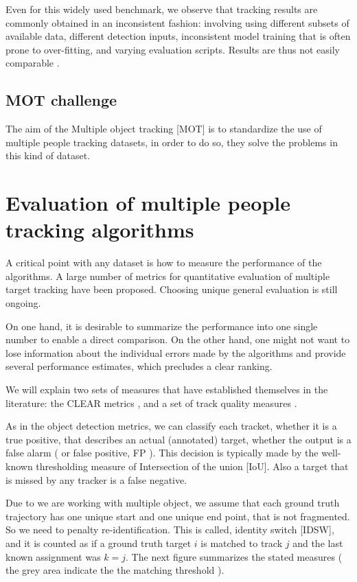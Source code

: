 Even for this widely used benchmark, we observe that tracking results are commonly obtained in an inconsistent fashion: involving using different subsets of available data, different detection inputs, inconsistent model training that is often prone to over-fitting, and varying evaluation scripts. Results are thus not easily comparable \cite{mot}.


\subsection{MOT challenge}

The aim of the Multiple object tracking [MOT] is to standardize the use of multiple people tracking datasets, in order to do so, they solve the problems in this kind of dataset.


\section{Evaluation of multiple people tracking algorithms}

A critical point with any dataset is how to measure the performance of the algorithms. A large number of metrics for quantitative evaluation of multiple target tracking have been proposed. Choosing unique general evaluation is still ongoing. 

On one hand, it is desirable to summarize the performance into one single number to enable a direct comparison. On the other hand, one might not want to lose information about the individual errors made by the algorithms and provide several performance estimates, which precludes a clear ranking.


We will explain two sets of measures that have established themselves in the literature: the CLEAR metrics \cite{clear}, and a set of track quality measures \cite{wu}.

As in the object detection metrics, we can classify each tracket, whether it is a true positive, that describes an actual (annotated) target, whether the output is a false alarm ( or false positive, FP ). This decision is typically made by the well-known thresholding measure of Intersection of the union [IoU]. Also a target that is missed by any tracker is a false negative.

Due to we are working with multiple object, we assume that each ground truth trajectory has one unique start and one unique end point, that is not fragmented. So we need to penalty re-identification. This is called, identity switch [IDSW], and it is counted as if a ground truth target $i$ is matched to track $j$ and the last known assignment was $ k = j$. The next figure summarizes the stated measures ( the grey area indicate the the matching threshold ).


